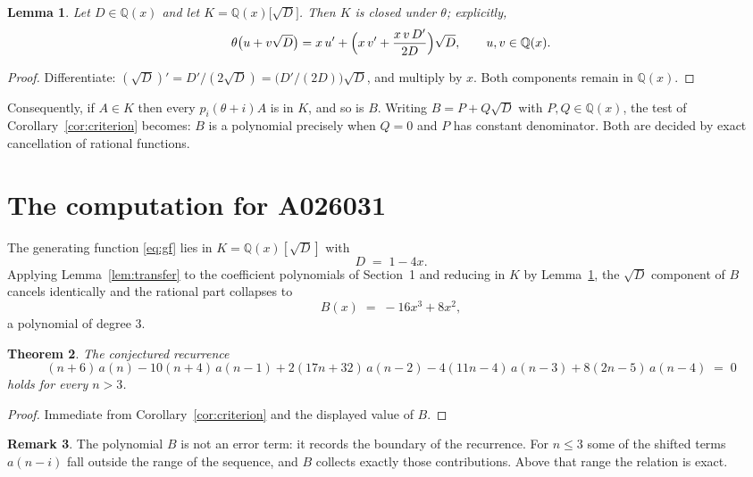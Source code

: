\documentclass[11pt,a4paper]{article}
\theoremstyle{plain}
\newtheorem{theorem}{Theorem}
\newtheorem{lemma}[theorem]{Lemma}
\theoremstyle{definition}
\newtheorem{remark}[theorem]{Remark}
\begin{document}
\begin{lemma}\label{lem:field}
Let $D\in\mathbb{Q}(x)$ and let $K=\mathbb{Q}(x)\bigl[\sqrt{D}\bigr]$. Then $K$ is closed
under $\theta$; explicitly,
\[
\theta\bigl(u+v\sqrt{D}\bigr)=x\,u'+\Bigl(x\,v'+\frac{x\,v\,D'}{2D}\Bigr)\sqrt{D},
\qquad u,v\in\mathbb{Q}(x).
\]
\end{lemma}

\begin{proof}
Differentiate: $(\sqrt{D})'=D'/(2\sqrt{D})=\bigl(D'/(2D)\bigr)\sqrt{D}$, and multiply by
$x$. Both components remain in $\mathbb{Q}(x)$.
\end{proof}

Consequently, if $A\in K$ then every $p_{i}(\theta+i)A$ is in $K$, and so is $B$. Writing
$B=P+Q\sqrt{D}$ with $P,Q\in\mathbb{Q}(x)$, the test of Corollary~\ref{cor:criterion}
becomes: $B$ is a polynomial precisely when $Q=0$ and $P$ has constant denominator. Both
are decided by exact cancellation of rational functions.

\section{The computation for A026031}

The generating function \eqref{eq:gf} lies in $K=\mathbb{Q}(x)[\sqrt{D}]$ with
\[
D \;=\; 1 - 4 x .
\]
Applying Lemma~\ref{lem:transfer} to the coefficient polynomials of Section~1 and reducing
in $K$ by Lemma~\ref{lem:field}, the $\sqrt{D}$ component of $B$ cancels identically and
the rational part collapses to
\[
B(x)\;=\;- 16 x^{3} + 8 x^{2} ,
\]
a polynomial of degree $3$.

\begin{theorem}
The conjectured recurrence
\[
(n + 6)\,a(n) -  10 \left(n + 4\right)\,a(n-1) + 2 \left(17 n + 32\right)\,a(n-2) -  4 \left(11 n - 4\right)\,a(n-3) + 8 \left(2 n - 5\right)\,a(n-4) \;=\;0
\]
holds for every $n>3$.
\end{theorem}

\begin{proof}
Immediate from Corollary~\ref{cor:criterion} and the displayed value of $B$.
\end{proof}

\begin{remark}
The polynomial $B$ is not an error term: it records the boundary of the recurrence. For
$n\le3$ some of the shifted terms $a(n-i)$ fall outside the range of the sequence,
and $B$ collects exactly those contributions. Above that range the relation is exact.
\end{remark}
\end{document}
